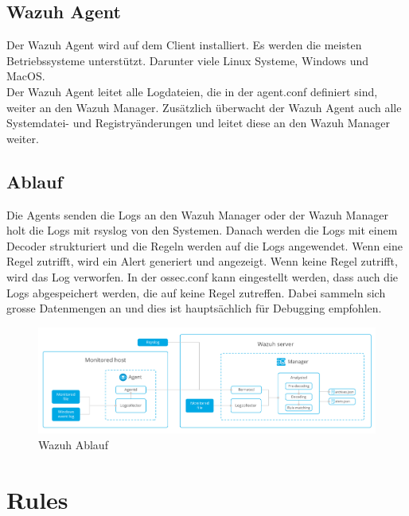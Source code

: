 

\subsection{Wazuh Agent}
Der Wazuh Agent wird auf dem Client installiert.
Es werden die meisten Betriebssysteme unterstützt. Darunter viele Linux Systeme, Windows und MacOS.\\

Der Wazuh Agent leitet alle Logdateien, die in der agent.conf definiert sind, weiter an den Wazuh Manager.
Zusätzlich überwacht der Wazuh Agent auch alle Systemdatei- und Registryänderungen und leitet diese an den Wazuh Manager weiter. 

\subsection{Ablauf}
Die Agents senden die Logs an den Wazuh Manager oder der Wazuh Manager holt die Logs mit rsyslog von den Systemen.
Danach werden die Logs mit einem Decoder strukturiert und die Regeln werden auf die Logs angewendet.
Wenn eine Regel zutrifft, wird ein Alert generiert und angezeigt.
Wenn keine Regel zutrifft, wird das Log verworfen.
In der ossec.conf kann eingestellt werden, dass auch die Logs abgespeichert werden, die auf keine Regel zutreffen.
Dabei sammeln sich grosse Datenmengen an und dies ist hauptsächlich für Debugging empfohlen.

\begin{figure}[H]
    \centering
    \includegraphics[width=\linewidth]{../img/wazuh-ablauf.png}
    \caption[Wazuh Ablauf]{Wazuh Ablauf\footnotemark}
\end{figure}

\section{Rules}
